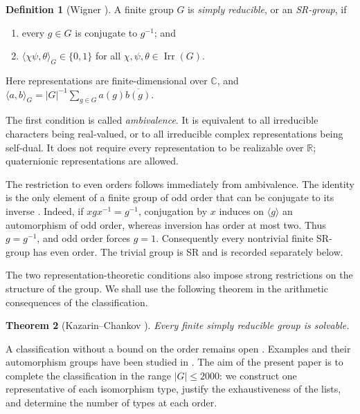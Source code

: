 \documentclass[11pt,a4paper]{amsart}
\newtheorem{thm}{Theorem}[section]
\theoremstyle{definition}
\newtheorem{defn}[thm]{Definition}
\theoremstyle{remark}
\DeclareMathOperator{\Irr}{Irr}
\numberwithin{equation}{section}
\begin{document}
\begin{defn}[Wigner \cite{Wig41}]\label{def:SR}
A finite group $G$ is \emph{simply reducible}, or an \emph{SR-group}, if
\begin{enumerate}
\item every $g\in G$ is conjugate to $g^{-1}$; and
\item $\langle\chi\psi,\theta\rangle_G\in\{0,1\}$ for all
$\chi,\psi,\theta\in\Irr(G)$.
\end{enumerate}
Here representations are finite-dimensional over $\mathbb C$, and
$\langle a,b\rangle_G=|G|^{-1}\sum_{g\in G}a(g)\overline{b(g)}$.
\end{defn}
The first condition is called \emph{ambivalence}. It is equivalent to
all irreducible characters being real-valued, or to all irreducible
complex representations being self-dual. It does not require every
representation to be realizable over $\mathbb R$; quaternionic
representations are allowed.

The restriction to even orders follows immediately from ambivalence.
The identity is the only element of a finite group of odd order that
can be conjugate to its inverse
\cite[Chapter~XXVI, Exercise~1.1]{BKZ19}. Indeed, if
$xgx^{-1}=g^{-1}$, conjugation by $x$ induces on $\langle g\rangle$
an automorphism of odd order, whereas inversion has order at most two.
Thus $g=g^{-1}$, and odd order forces $g=1$. Consequently every
nontrivial finite SR-group has even order. The trivial group is SR
and is recorded separately below.

The two representation-theoretic conditions also impose strong
restrictions on the structure of the group. We shall use the following theorem in the arithmetic consequences
of the classification.
\begin{thm}[Kazarin--Chankov \cite{KC10}]\label{thm:sr-solvable}
Every finite simply reducible group is solvable.
\end{thm}
A classification without a bound on the order remains open
\cite[Problem~11.94]{KM26}. Examples and their automorphism groups
have been studied in \cite{Luan20,Luan21}. The aim of the present
paper is to complete the classification in the range $|G|\le2000$:
we construct one representative of each isomorphism type, justify
the exhaustiveness of the lists, and determine the number of types
at each order.
\end{document}
